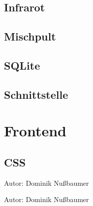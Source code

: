 \documentclass[
    headings=optiontotocandhead,%
    twoside,
    numbers=noenddot,%
    toc=flat, %
    12pt, %
    titlepage, %
    parskip=full, %
    listof=totoc, %
    listof=flat, %
    numbers=noenddot, %
    bibliography=totoc, %
    a4paper,DIV=14,
    BCOR=15mm,
]{scrbook}
\begin{document}
\renewcommand{\kapitelautor}{Autor: Clemens Scharwitzl}



\section{Infrarot}\label{Infrarot}

\renewcommand{\kapitelautor}{Autor: Clemens Scharwitzl}



\section{Mischpult}\label{Mischpult}

\renewcommand{\kapitelautor}{Autor: Clemens Scharwitzl}

% 

\section{SQLite}\label{SQLite}

\renewcommand{\kapitelautor}{Autor: Clemens Scharwitzl}

% 

\section{Schnittstelle}\label{Schnittstelle}

\renewcommand{\kapitelautor}{Autor: Clemens Scharwitzl}

% 

\chapter{Frontend}\label{Frontend}

\section{CSS}\label{CSS}

\renewcommand{\kapitelautor}{Autor: Dominik Nußbaumer}

    {Autor: Dominik Nußbaumer}

    {Autor: Dominik Nußbaumer}
\end{document}
